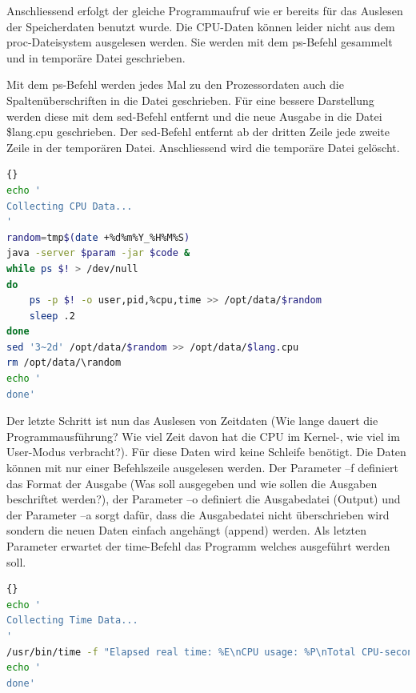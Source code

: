 \documentclass{fancydocument}
\begin{document}
Anschliessend erfolgt der gleiche Programmaufruf wie er bereits für das Auslesen der Speicherdaten benutzt wurde. Die CPU-Daten können leider nicht aus dem proc-Dateisystem ausgelesen werden. Sie werden mit dem ps-Befehl gesammelt und in temporäre Datei geschrieben.

Mit dem ps-Befehl werden jedes Mal zu den Prozessordaten auch die Spaltenüberschriften in die Datei geschrieben. Für eine bessere Darstellung werden diese mit dem sed-Befehl entfernt und die neue Ausgabe in die Datei \$lang.cpu geschrieben. Der sed-Befehl entfernt ab der dritten Zeile jede zweite Zeile in der temporären Datei. Anschliessend wird die temporäre Datei gelöscht.

\begin{minipage}{\textwidth}
\begin{lstlisting}[language=bash,caption=CPU-Daten sammeln]{}
echo '
Collecting CPU Data...
'
random=tmp$(date +%d%m%Y_%H%M%S)
java -server $param -jar $code &	
while ps $! > /dev/null
do
	ps -p $! -o user,pid,%cpu,time >> /opt/data/$random
	sleep .2
done
sed '3~2d' /opt/data/$random >> /opt/data/$lang.cpu
rm /opt/data/\random
echo '
done'
\end{lstlisting}
\end{minipage}

Der letzte Schritt ist nun das Auslesen von Zeitdaten (Wie lange dauert die Programmausführung? Wie viel Zeit davon hat die CPU im Kernel-, wie viel im User-Modus verbracht?). Für diese Daten wird keine Schleife benötigt. Die Daten können mit nur einer Befehlszeile ausgelesen werden. Der Parameter –f definiert das Format der Ausgabe (Was soll ausgegeben und wie sollen die Ausgaben beschriftet werden?), der Parameter –o definiert die Ausgabedatei (Output) und der Parameter –a sorgt dafür, dass die Ausgabedatei nicht überschrieben wird sondern die neuen Daten einfach angehängt (append) werden. Als letzten Parameter erwartet der time-Befehl das Programm welches ausgeführt werden soll.

\begin{minipage}{\textwidth}
\begin{lstlisting}[language=bash,caption=Zeitdaten sammeln]{}
echo '
Collecting Time Data...
'
/usr/bin/time -f "Elapsed real time: %E\nCPU usage: %P\nTotal CPU-seconds in user mode: %U\nTotal CPU-seconds in kernel mode: %S\nName and arguments of the command: %C" -o /opt/data/$lang.time -a java -server $param -jar $code
echo '
done'
\end{lstlisting}
\end{minipage}
\end{document}

